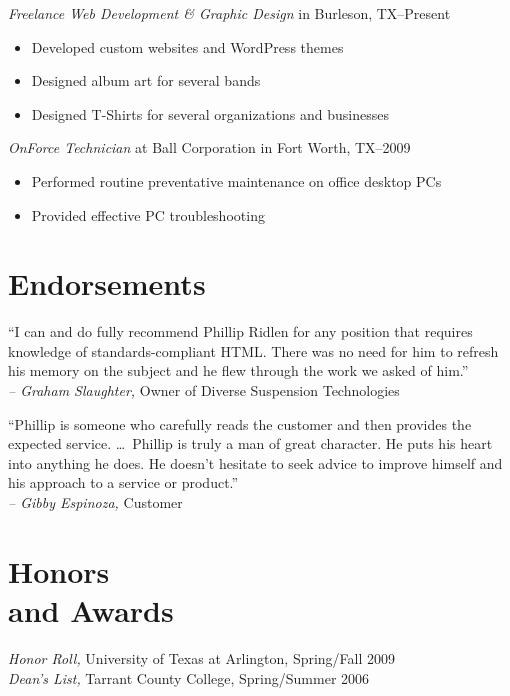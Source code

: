 \documentclass[margin]{res}
\begin{document}
\begin{resume}
                {\sl Freelance Web Development \textrm{\&} Graphic Design}
                in Burleson, TX--Present
                \begin{itemize} \itemsep -2pt %
                  \item Developed custom websites and WordPress themes
                  \item Designed album art for several bands
                  \item Designed T-Shirts for several organizations and businesses
                \end{itemize}
                
                {\sl OnForce Technician}
                at Ball Corporation in Fort Worth, TX--2009
                \begin{itemize} \itemsep -2pt %
                  \item Performed routine preventative maintenance on office desktop PCs
                  \item Provided effective PC troubleshooting
                \end{itemize}

      
\section{\textsf{Endorsements}}
                
                ``I can and do fully recommend Phillip Ridlen for any position that requires 
                knowledge of standards-compliant HTML. There was no need for him to refresh his 
                memory on the subject and he flew through the work we asked of him.'' \\
                {\sl -- Graham Slaughter,} Owner of Diverse Suspension Technologies

                ``Phillip is someone who carefully reads the customer and then 
                provides the expected service. \ldots\ Phillip is truly a man of great character. 
                He puts his heart into anything he does. He doesn't hesitate to seek advice 
                to improve himself and his approach to a service or product.'' \\
                {\sl -- Gibby Espinoza,} Customer


\section{\textsf{Honors \\and Awards}}
                
                {\sl Honor Roll,} University of Texas at Arlington, Spring/Fall 2009 \\
                {\sl Dean's List,} Tarrant County College, Spring/Summer 2006
                
                
\end{resume}
\end{document}
